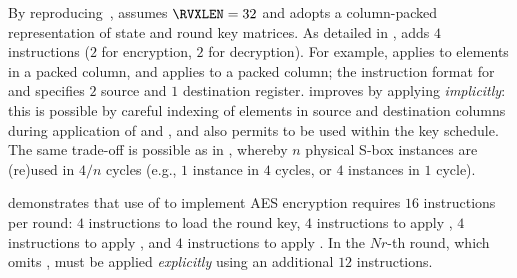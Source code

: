 
By reproducing~\cite[Section 4.3]{TilGro:06},
assumes 
$\RVXLEN = 32$
and adopts a 
column-packed 
representation of state and round key matrices.
As detailed in
,
adds
$ 4$
instructions ($2$ for encryption, $2$ for decryption).
For example,
applies 
to elements in   a packed column,
and
applies 
to               a packed column;
the instruction format for
and
specifies $2$ source and $1$ destination register.
 improves  by applying  
{\em implicitly}:
this is possible by careful indexing of elements in source and destination
columns during application of  and ,
and also permits
to be used within the key schedule.
The same trade-off is possible as in , whereby
$n$ physical S-box instances are (re)used in $4/n$ cycles
(e.g., $1$ instance in $4$ cycles, or $4$ instances in $1$ cycle).

demonstrates that use of  to implement AES encryption requires
$16$ instructions per round:
$ 4$            
     instructions to load the round key,
$ 4$            
     instructions to apply ,
$ 4$   
     instructions to apply ,
     and
$ 4$   
     instructions to apply .
In the $Nr$-th round, which omits ,
 must be applied
{\em explicitly}
using an additional $12$ instructions.

